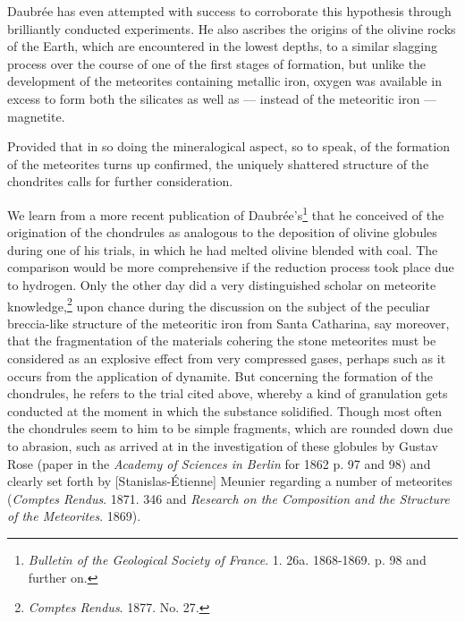 \documentclass[a4paper, 12pt, oneside]{article}
\begin{document}
Daubrée has even attempted with success to corroborate this hypothesis through brilliantly conducted experiments. He also ascribes the origins of the olivine rocks of the Earth, which are encountered in the lowest depths, to a similar slagging process over the course of one of the first stages of formation, but unlike the development of the meteorites containing metallic iron, oxygen was available in excess to form both the silicates as well as --- instead of the meteoritic iron --- magnetite.

Provided that in so doing the mineralogical aspect, so to speak, of the formation of the meteorites turns up confirmed, the uniquely shattered structure of the chondrites calls for further consideration.

We learn from a more recent publication of Daubrée's\footnote{\emph{Bulletin of the Geological Society of France}. 1. 26a. 1868-1869. p. 98 and further on.} that he conceived of the origination of the chondrules as analogous to the deposition of olivine globules during one of his trials, in which he had melted olivine blended with coal. The comparison would be more comprehensive if the reduction process took place due to hydrogen. Only the other day did a very distinguished scholar on meteorite knowledge,\footnote{\emph{Comptes Rendus}. 1877. No. 27.} upon chance during the discussion on the subject of the peculiar breccia-like structure of the meteoritic iron from Santa Catharina, say moreover, that the fragmentation of the materials cohering the stone meteorites must be considered as an explosive effect from very compressed gases, perhaps such as it occurs from the application of dynamite. But concerning the formation of the chondrules, he refers to the trial cited above, whereby a kind of granulation gets conducted at the moment in which the substance solidified. Though most often the chondrules seem to him to be simple fragments, which are rounded down due to abrasion, such as arrived at in the investigation of these globules by Gustav Rose (paper in the \emph{Academy of Sciences in Berlin} for 1862 p. 97 and 98) and clearly set forth by [Stanislas-Étienne] Meunier regarding a number of meteorites (\emph{Comptes Rendus}. 1871. 346 and \emph{Research on the Composition and the Structure of the Meteorites}. 1869).
\end{document}
